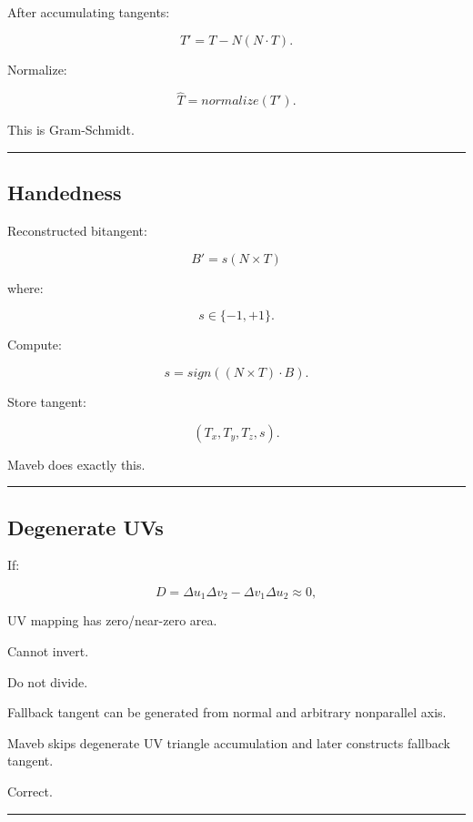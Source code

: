 After accumulating tangents:

\[
T'
=
T-N(N\cdot T).
\]

Normalize:

\[
\boxed{
\hat T=
normalize(T').
}
\]

This is Gram-Schmidt.

\begin{center}\rule{0.5\linewidth}{0.5pt}\end{center}

\subsection{Handedness}\label{04-visual-computing-ii-ch041-handedness}

Reconstructed bitangent:

\[
B'
=
s(N\times T)
\]

where:

\[
s\in\{-1,+1\}.
\]

Compute:

\[
\boxed{
s=
sign(
(N\times T)\cdot B
).
}
\]

Store tangent:

\[
(T_x,T_y,T_z,s).
\]

Maveb does exactly this.

\begin{center}\rule{0.5\linewidth}{0.5pt}\end{center}

\subsection{Degenerate UVs}\label{04-visual-computing-ii-ch041-degenerate-uvs}

If:

\[
D
=
\Delta u_1\Delta v_2-
\Delta v_1\Delta u_2
\approx0,
\]

UV mapping has zero/near-zero area.

Cannot invert.

Do not divide.

Fallback tangent can be generated from normal and arbitrary nonparallel axis.

Maveb skips degenerate UV triangle accumulation and later constructs fallback tangent.

Correct.

\begin{center}\rule{0.5\linewidth}{0.5pt}\end{center}

